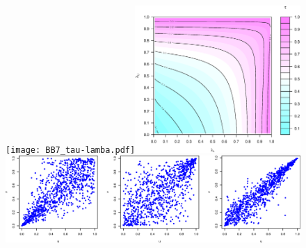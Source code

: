 \documentclass{beamer}
\begin{document}
\begin{frame}[plain]
  \begin{figure}
    \centering
    \vspace{-0.35cm}
    \texttt{[image: BB7\_tau-lamba.pdf]}\includegraphics[width=0.56\textwidth]{tau-contour}\\
    \includegraphics[width=\textwidth]{BB7Scatter.eps}
  \end{figure}
\end{frame}
\end{document}

